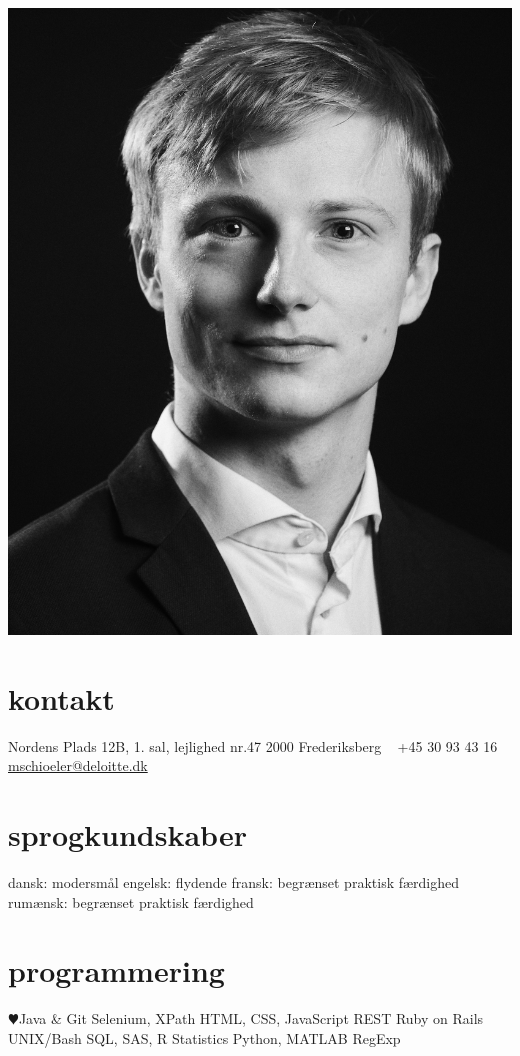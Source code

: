 \documentclass[]{../friggeri-cv} %
\begin{document}


\begin{aside} %
\includegraphics[width=\linewidth]{../graphics/pic8x10.jpg}
\section{kontakt}
Nordens Plads 12B,
1. sal, lejlighed nr.47
2000 Frederiksberg
~
+45 30 93 43 16
{\small \href{mschioeler@deloitte.dk}{mschioeler@deloitte.dk}}
\section{sprogkundskaber}
	dansk:  \quad modersmål
	engelsk: \quad flydende
	fransk: \quad begrænset praktisk færdighed
	rumænsk: \quad begrænset praktisk færdighed
\section{programmering}
{\color{red} $\varheartsuit$}Java \& Git 
Selenium, XPath
HTML, CSS, JavaScript
REST
Ruby on Rails
UNIX/Bash
SQL, SAS, R Statistics
Python, \textsc{MATLAB}
RegExp
\end{aside}
\end{document}
